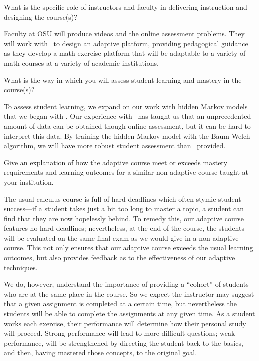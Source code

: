 \begin{subquestion}
 What is the specific role of instructors and faculty in delivering
 instruction and designing the course(s)?
\end{subquestion}

Faculty at OSU will produce videos and the online assessment problems.
They will work with \gratisu\ to design an adaptive platform,
providing pedagogical guidance as they develop a math exercise
platform that will be adaptable to a variety of math courses at a
variety of academic institutions.

\begin{subquestion}
 What is the way in which you will assess student learning and mastery
 in the course(s)?
\end{subquestion}

To assess student learning, we expand on our work with hidden Markov
models that we began with \mooculus. Our experience with \mooculus\
has taught us that an unprecedented amount of data can be obtained
though online assessment, but it can be hard to interpret this data.
By training the hidden Markov model with the Baum-Welch algorithm, we
will have more robust student assessment than \mooculus\ provided.

\begin{subquestion}
 Give an explanation of how the adaptive course meet or exceeds
 mastery requirements and learning outcomes for a similar non-adaptive
 course taught at your institution.
\end{subquestion}

The usual calculus course is full of hard deadlines which often stymie
student success---if a student takes just a bit too long to master a
topic, a student can find that they are now hopelessly behind.  To
remedy this, our adaptive course features no hard deadlines;
nevertheless, at the end of the course, the students will be evaluated
on the same final exam as we would give in a non-adaptive course.
This not only ensures that our adaptive course exceeds the usual
learning outcomes, but also provides feedback as to the effectiveness
of our adaptive techniques.

We do, however, understand the importance of providing a ``cohort'' of
students who are at the same place in the course.  So we expect the
instructor may suggest that a given assignment is completed at a
certain time, but nevertheless the students will be able to complete
the assignments at any given time. As a student works each exercise,
their performance will determine how their personal study will
proceed.  Strong performance will lead to more difficult questions;
weak performance, will be strengthened by directing the student back
to the basics, and then, having mastered those concepts, to the
original goal.

